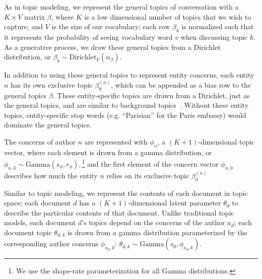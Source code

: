 
As in topic modeling, we represent the general topics of conversation with a $K\times V$ matrix $\beta$, where $K$ is a low dimensional number of topics that we wish to capture, and $V$ is the size of our vocabulary; each row $\beta_k$ is normalized such that it represents the probability of seeing vocabulary word $v$ when discussing topic $k$.  As a generative process, we draw these general topics from a Dirichlet distribution, or $\beta_k \sim \mbox{Dirichlet}_V (\alpha_\beta).$ 

In addition to using these general topics to represent entity concerns, each entity $n$ has its own exclusive topic $\beta^{(n)}_{0}$, which can be appended as a bias row to the general topics $\beta$.  These entity-specific topics are drawn from a Dirichlet, just as the general topics, and are similar to
background topics~\cite{paul2012model}.  Without these entity topics, entity-specific stop words (e.g. ``Parisian'' for the Paris embassy) would dominate the general topics.

The concerns of author $n$ are represented with $\phi_n$, a $(K+1)$-dimensional topic vector, where each element is drawn from a gamma distribution, or $\phi_{n,k} \sim \mbox{Gamma}(s_\phi, r_\phi),$\footnote{We use the shape-rate parameterization for all Gamma distributions.} and the first element of the concern vector $\phi_{n,0}$ describes how much the entity $n$ relies on its exclusive topic $\beta^{(n)}_0$

Similar to topic modeling, we represent the contents of each document in topic space; each document $d$ has a $(K+1)$-dimensional latent parameter $\theta_d$ to describe the particular contents of that document.  Unlike traditional topic models, each document $d$'s topics depend on the concerns of the author $a_d$; each document topic $\theta_{d,k}$ is drawn from a gamma distribution parameterized by the corresponding author concerns $\phi_{a_d,k}$: $\theta_{d,k} \sim \mbox{Gamma}(s_\theta, \phi_{a_d,k})$.

